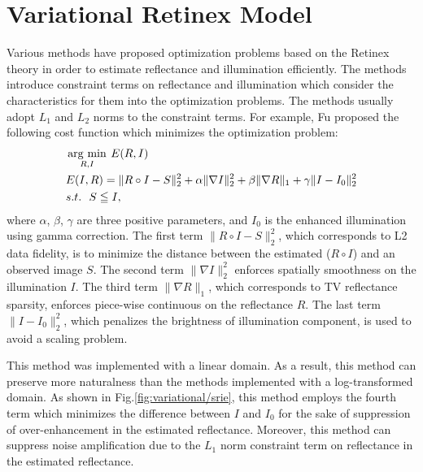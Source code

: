 \section{Variational Retinex Model} \label{sec:variational_retinex}
Various methods have proposed optimization problems based on the Retinex theory in order to estimate reflectance and illumination efficiently. The methods introduce constraint terms on reflectance and illumination which consider the characteristics for them into the optimization problems. The methods usually adopt $L_{1}$ and $L_{2}$ norms to the constraint terms. For example, Fu \cite{srie} proposed the following cost function which minimizes the optimization problem:
\begin{equation}
\begin{split}
& \mathop{\rm arg~min}\limits_{R, I}{\: E(R, I)}\\ 
& E(I, R) = \|R \circ I - S\|_{2}^{2} + \alpha\|\nabla{I}\|_{2}^{2} + \beta\|\nabla{R}\|_{1} + \gamma\|I - I_{0}\|_{2}^{2} \\
& s.t. \ \ S \leqq I, \label{eq:srie_equation}
\end{split}
\end{equation}
where $\alpha$, $\beta$, $\gamma$ are three positive parameters, and $I_{0}$ is the enhanced illumination using gamma correction.
The first term $\|R \circ I - S\|_{2}^{2}$, which corresponds to L2 data fidelity, is to minimize the distance between the estimated ($R\circ{I}$) and an observed image $S$. The second term $\|\nabla{I}\|_{2}^{2} $ enforces spatially smoothness on the illumination $I$. The third term $\|\nabla{R}\|_{1}$, which corresponds to TV reflectance sparsity, enforces piece-wise continuous on the reflectance $R$. The last term $\|I-I_{0}\|_{2}^{2}$, which penalizes the brightness of illumination component, is used to avoid a scaling problem.\par
This method was implemented with a linear domain. As a result, this method can preserve more naturalness than the methods implemented with a log-transformed domain. As shown in Fig.\ref{fig:variational/srie}, this method employs the fourth term which minimizes the difference between $I$ and $I_{0}$ for the sake of suppression of over-enhancement in the estimated reflectance. Moreover, this method can suppress noise amplification due to the $L_{1}$ norm constraint term on reflectance in the estimated reflectance.
